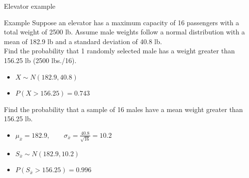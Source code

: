\documentclass[xcolor=table, handout]{beamer}
\begin{document}
\begin{frame}{Elevator example}
\begin{exampleblock}{Example}
Suppose an elevator has a maximum capacity of 16 passengers with a total weight of 2500 lb. Assume male weights follow a normal distribution with a mean of 182.9 lb and a standard deviation of 40.8 lb. \\
\medskip
Find the probability that 1 randomly selected male has a weight greater than 156.25 lb (2500 lbs./16).
\begin{itemize}
\pause\item $X \sim N(182.9, 40.8)$
\pause\item $P( X > 156.25) = 0.743$
\end{itemize}
\pause\medskip
Find the probability that a sample of 16 males have a mean weight greater than 156.25 lb. 
\begin{itemize}
\pause\item $\mu_{\bar x} = 182.9, \qquad \sigma_{\bar x} = \frac {40.8}{\sqrt{16}} = 10.2$
\pause\item $S_{\bar x} \sim N(182.9, 10.2)$
\pause\item $P(S_{\bar x} > 156.25) = 0.996$
\end{itemize}
\end{exampleblock}
\end{frame}
\end{document}
